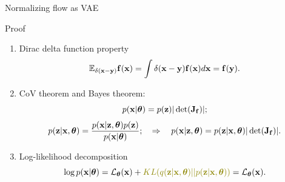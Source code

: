 \begin{frame}{Normalizing flow as VAE}
	\begin{block}{Proof}
		\begin{enumerate}
			\item Dirac delta function property 
			\[
				\mathbb{E}_{\delta(\mathbf{x} - \mathbf{y})} \mathbf{f}(\mathbf{x}) = \int \delta(\mathbf{x} - \mathbf{y}) \mathbf{f}(\mathbf{x}) d \mathbf{x} = \mathbf{f}(\mathbf{y}).
			\]
			\item CoV theorem and Bayes theorem:
			\[
				p(\mathbf{x} | \boldsymbol{\theta}) = p(\mathbf{z}) |\det (\mathbf{J}_{\mathbf{f}})|;
			\]
			\[
				p(\mathbf{z} | \mathbf{x}, \boldsymbol{\theta}) = \frac{p(\mathbf{x} | \mathbf{z}, \boldsymbol{\theta}) p(\mathbf{z})}{p(\mathbf{x} | \boldsymbol{\theta})}; \quad \Rightarrow \quad p(\mathbf{x} | \mathbf{z}, \boldsymbol{\theta}) = p(\mathbf{z} | \mathbf{x}, \boldsymbol{\theta}) |\det (\mathbf{J}_{\mathbf{f}})|.
			\]
			\item Log-likelihood decomposition
			\[
				\log p(\bx | \btheta) = \cL_{\btheta}(\bx) + {\color{olive}KL(q(\bz | \bx, \btheta) || p(\bz | \bx, \btheta))} = \cL_{\btheta}(\bx).
			\]
		\end{enumerate}
	\end{block}
\end{frame}
